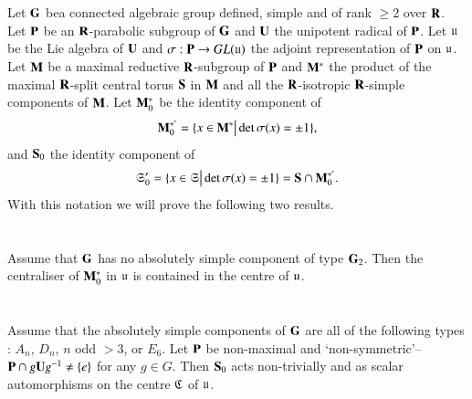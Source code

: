 \section{}%
Let $\mathbf{G}$ be\pageoriginale a connected algebraic group defined, simple and of rank $\geqslant 2$ over $\mathbf{R}$. Let $\mathbf{P}$ be an $\mathbf{R}$-parabolic subgroup of $\mathbf{G}$ and $\mathbf{U}$ the unipotent radical of $\mathbf{P}$. Let $\mathfrak{u}$ be the Lie algebra of $\mathbf{U}$ and $\sigma : \mathbf{P} \to GL (\mathfrak{u})$ the adjoint representation of $\mathbf{P}$ on $\mathfrak{u}$. Let $\mathbf{M}$ be a maximal reductive $\mathbf{R}$-subgroup of $\mathbf{P}$ and $\mathbf{M}^\ast$ the product of the maximal $\mathbf{R}$-split central torus $\mathbf{S}$ in $\mathbf{M}$ and all the $\mathbf{R}$-isotropic $\mathbf{R}$-simple components of $\mathbf{M}$. Let $\mathbf{M}^\ast_0$ be the identity component of 
$$
\mathbf{M}^{\ast'}_0 = \{x \in \mathbf{M}^\ast \big| \det \sigma (x) = \pm 1\},
$$
and $\mathbf{S}_0$ the identity component of 
$$
\mathfrak{S}'_0 = \{x \in \mathfrak{S} \big| \det \sigma (x) = \pm 1\} = \mathbf{S} \cap \mathbf{M}^{\ast'}_0.
$$
With this notation we will prove the following two results. 

\section{}%
\begin{alphlemma}\label{art9-lem-A}
Assume that $\mathbf{G}$ has no absolutely simple component of type $\mathbf{G}_2$. Then the centraliser of $\mathbf{M}^\ast_0$ in $\mathfrak{u}$ is contained in the centre of $\mathfrak{u}$.
\end{alphlemma}

\section{}%
\begin{alphlemma}\label{art9-lem-B}
Assume that the absolutely simple components of $\mathbf{G}$ are all of the following types : $A_n$, $D_n$, $n$ odd $> 3$, or $E_6$. Let $\mathbf{P}$ be non-maximal and `non-symmetric'--\ie $\mathbf{P} \cap g \mathbf{U} g^{-1} \neq \{e\}$ for any $g \in G$. Then $\mathbf{S}_0$ acts non-trivially and as scalar automorphisms on the centre $\mathfrak{C}$ of $\mathfrak{u}$.
\end{alphlemma}

